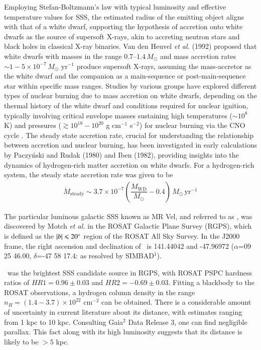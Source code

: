     Employing Stefan-Boltzmann's law with typical luminosity and effective temperature values for SSS, the estimated radius of the emitting object aligns with that of a white dwarf, supporting the hypothesis of accretion onto white dwarfs as the source of supersoft X-rays, akin to accreting neutron stars and black holes in classical X-ray binaries. Van den Heuvel \textit{et al.} (1992) proposed that white dwarfs with masses in the range $0.7–1.4\,M_\odot$ and mass accretion rates $\sim 1-5\times 10^{-7}\,M_\odot\text{ yr}^{-1}$ produce supersoft X-rays, assuming the mass-accretor as the white dwarf and the companion as a main-sequence or post-main-sequence star within specific mass ranges. %
    Studies by various groups have explored different types of nuclear burning due to mass accretion on white dwarfs, depending on the thermal history of the white dwarf and conditions required for nuclear ignition, typically involving critical envelope masses %
    sustaining high temperatures ($\sim 10^8$ K) and pressures ($\gtrsim 10^{18}-10^{20}$ g cm$^{-1}$ s$^{-2}$) for nuclear burning via the CNO cycle \cite{paczynski78,prialnik78,sion79,sienkiewicz80,nomoto82,fujimoto82a,fujimoto82b,iben82,prialnik95,macdonald83}. The steady state accretion rate, crucial for understanding the relationship between accretion and nuclear burning, has been investigated in early calculations by Paczy\'{n}ski and Rudak (1980) \cite{paczynski80} and Iben (1982), providing insights into the dynamics of hydrogen-rich matter accretion on white dwarfs. For a hydrogen-rich system, the steady state accretion rate was given to be \cite{hachisu2001}
	\begin{align}
		\dot{M}_\text{steady}\sim 3.7\times 10^{-7}\left( \dfrac{M_\text{WD}}{M_\odot}-0.4 \right)\,M_\odot\,\text{yr}^{-1} \label{eqn:steady-mass-accr}
	\end{align}
	
	The particular luminous galactic SSS known as MR Vel, and referred to as \source, was discovered by Motch \textit{et al.} \cite{motch1994} in the ROSAT Galactic Plane Survey (RGPS), which  is defined as the $|b|\leqslant 20\degree$ region of the ROSAT All Sky Survey. In the J2000 frame, the right ascension and declination of \source\ is 141.44042 and -47.96972 ($\alpha$=09 25 46.00, $\delta$=-47 58 17.4: as resolved by SIMBAD$^1$).
	
	\source\ was the brightest SSS candidate source in RGPS, with ROSAT PSPC hardness ratios of $HR1=0.96\pm 0.03$ and $HR2=-0.69\pm 0.03$. Fitting a blackbody to the ROSAT observations, a hydrogen column density in the range $n_H=(1.4-3.7)\times 10^{22}$ cm$^{-2}$ can be obtained. There is a considerable amount of uncertainty in current literature about its distance, with estimates ranging from 1 kpc to 10 kpc. Consulting Gaia$^2$ Data Release 3, one can find negligible parallax. This fact along with its high luminosity suggests that its distance is likely to be $>5$ kpc.
	
